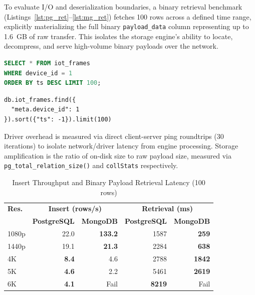 \documentclass[conference]{IEEEtran}
\begin{document}
To evaluate I/O and deserialization boundaries, a binary retrieval benchmark (Listings~\ref{lst:pg_ret}--\ref{lst:mg_ret}) fetches 100 rows across a defined time range, explicitly materializing the full binary \texttt{payload\_data} column representing up to 1.6~GB of raw transfer. This isolates the storage engine's ability to locate, decompress, and serve high-volume binary payloads over the network.

\begin{lstlisting}[language=SQL,basicstyle=\ttfamily\scriptsize,breaklines=true,caption={PostgreSQL binary retrieval query.},label={lst:pg_ret}]
SELECT * FROM iot_frames
WHERE device_id = 1
ORDER BY ts DESC LIMIT 100;
\end{lstlisting}

\begin{lstlisting}[basicstyle=\ttfamily\scriptsize,breaklines=true,caption={MongoDB binary retrieval pipeline.},label={lst:mg_ret}]
db.iot_frames.find({
  "meta.device_id": 1
}).sort({"ts": -1}).limit(100)
\end{lstlisting}

Driver overhead is measured via direct client-server ping roundtrips (30 iterations) to isolate network/driver latency from engine processing. Storage amplification is the ratio of on-disk size to raw payload size, measured via \texttt{pg\_total\_relation\_size()} and \texttt{collStats} respectively.


\begin{table}[htbp]
\centering
\renewcommand{\arraystretch}{1.1}
\caption{Insert Throughput and Binary Payload Retrieval Latency (100 rows)}
\label{tab:performance_summary}
\begin{tabular}{l r r r r}
\hline
\textbf{Res.} & \multicolumn{2}{c}{\textbf{Insert (rows/s)}} & \multicolumn{2}{c}{\textbf{Retrieval (ms)}} \\
 & \textbf{PostgreSQL} & \textbf{MongoDB} & \textbf{PostgreSQL} & \textbf{MongoDB} \\
\hline
1080p & 22.0  & \textbf{133.2} & 1587   & \textbf{259}   \\
1440p & 19.1  & \textbf{21.3}  & 2284   & \textbf{638}   \\
4K    & \textbf{8.4}   & 4.6   & 2788   & \textbf{1842}  \\
5K    & \textbf{4.6}   & 2.2   & 5461   & \textbf{2619}  \\
6K    & \textbf{4.1}   & Fail  & \textbf{8219}   & Fail  \\
\hline
\end{tabular}
\end{table}
\end{document}
